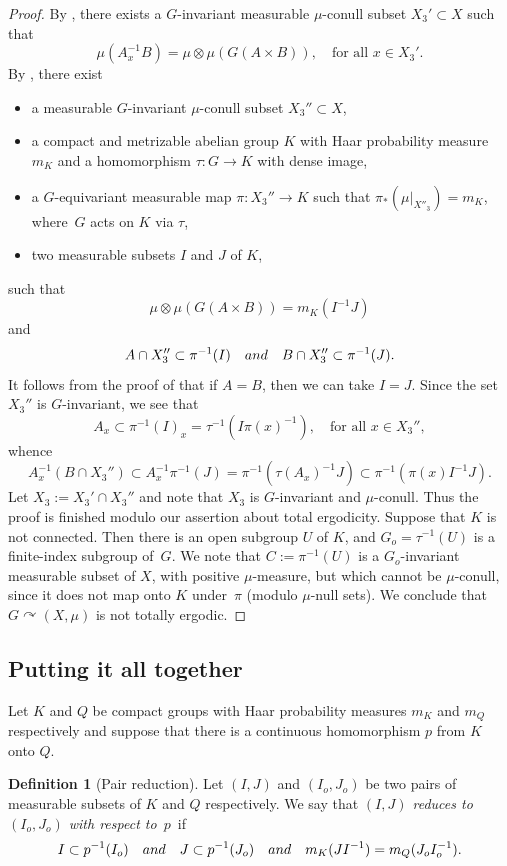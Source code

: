 \documentclass[11pt]{article}
\numberwithin{equation}{section}
\newcommand{\qand}{\quad\textup{and}\quad}
\let\acts\curvearrowright
\theoremstyle{plain}
\theoremstyle{definition}
\newtheorem{definition}[theorem]{Definition}
\begin{document}
\begin{proof}
By \cite[Lem.\,5.3]{BF}, there exists a $G$-invariant measurable $\mu$-conull subset \hbox{$X_3' \subset X$} such that
\[
\mu(A_x^{-1}B) = \mu \otimes \mu(G(A \times B)), \quad \textrm{for all $x \in X_3'$}.
\]
By \cite[Th.\,5.1]{BF}, there exist
\begin{itemize}
\item a measurable $G$-invariant $\mu$-conull subset $X_3'' \subset X$,
\item a compact and metrizable abelian group $K$ with Haar probability measure $m_K$ and
a homomorphism $\tau : G \to K$ with dense image,
\item a $G$-equivariant measurable map $\pi : X_3''\!\to\!K$ such that $\pi_*(\mu |_{X''_3})\!=\!m_K$, where~$G$ acts on $K$ via $\tau$,
\item two measurable subsets $I$ and $J$ of $K$,
\end{itemize}
such that
\[
\mu \otimes \mu (G(A \times B)) = m_K(I^{-1}J)
\]
and
\[
A \cap X_3'' \subset \pi^{-1}(I) \qand B \cap X_3'' \subset \pi^{-1}(J).
\]
It follows from the proof of \cite[Th.\,5.1]{BF} that if $A = B$, then we can take $I = J$. Since the set $X_3''$ is $G$-invariant,
we see that
\[
A_x \subset \pi^{-1}(I)_x = \tau^{-1}(I\pi(x)^{-1}), \quad \textrm{for all $x \in X_3''$},
\]
whence
\[
A_x^{-1}(B \cap X_3'') \subset A_x^{-1}\pi^{-1}(J) = \pi^{-1}(\tau(A_x)^{-1}J) \subset \pi^{-1}(\pi(x) I^{-1}J).
\]
Let $X_3 := X_3' \cap X_3''$ and note that $X_3$ is $G$-invariant and $\mu$-conull. Thus the proof is finished modulo our assertion about total ergodicity. Suppose that $K$ is not connected. Then there is an open subgroup $U$ of $K$, and $G_o = \tau^{-1}(U)$ is a finite-index
subgroup of~$G$. We note that $C := \pi^{-1}(U)$ is a $G_o$-invariant measurable subset of $X$, with positive $\mu$-measure, but
which cannot be $\mu$-conull, since it does not map onto $K$ under~$\pi$ (modulo $\mu$-null sets). We conclude that $G \acts (X,\mu)$
is not totally ergodic.
\end{proof}

\subsection{Putting it all together}

Let $K$ and $Q$ be compact groups with Haar probability measures $m_K$ and $m_Q$ respectively and
suppose that there is a continuous homomorphism $p$ from $K$ onto $Q$.

\begin{definition}[Pair reduction]
\label{def_reduction}
Let $(I,J)$ and $(I_o,J_o)$ be two pairs of measurable subsets of $K$ and $Q$ respectively. We say
that \emph{$(I,J)$ reduces to $(I_o,J_o)$ with respect to~$p$}~if
\[
I \subset p^{-1}(I_o) \qand J \subset p^{-1}(J_o) \qand m_K(J I^{-1}) = m_Q(J_o I_o^{-1}).
\]
\end{definition}
\end{document}
